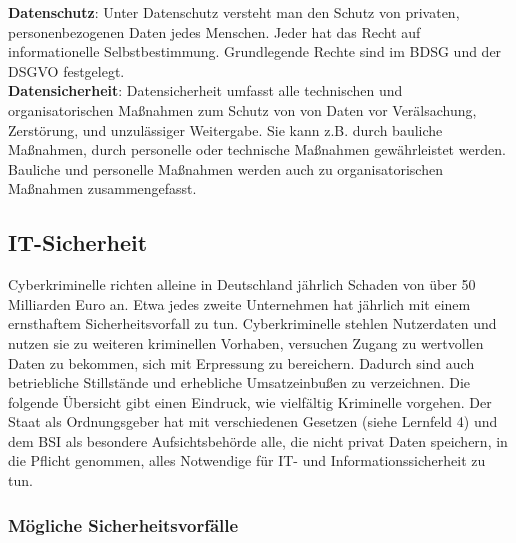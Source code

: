 \documentclass[a4paper, 12pt]{report}
\begin{document}
\begin{multicols}{2}
\textbf{Datenschutz}: Unter Datenschutz versteht man den Schutz von privaten,
personenbezogenen Daten jedes Menschen. Jeder hat das Recht auf informationelle
Selbstbestimmung. Grundlegende Rechte sind im BDSG und der DSGVO festgelegt. \\

\textbf{Datensicherheit}: Datensicherheit umfasst alle technischen und
organisatorischen Maßnahmen zum Schutz von von Daten vor Verälsachung,
Zerstörung, und unzulässiger Weitergabe. Sie kann z.B. durch bauliche Maßnahmen,
durch personelle oder technische Maßnahmen gewährleistet werden. Bauliche und
personelle Maßnahmen werden auch zu organisatorischen Maßnahmen zusammengefasst.

\subsection{IT-Sicherheit}

Cyberkriminelle richten alleine in Deutschland jährlich Schaden von über 50
Milliarden Euro an. Etwa jedes zweite Unternehmen hat jährlich mit einem
ernsthaftem Sicherheitsvorfall zu tun. Cyberkriminelle stehlen Nutzerdaten und
nutzen sie zu weiteren kriminellen Vorhaben, versuchen Zugang zu wertvollen
Daten zu bekommen, sich mit Erpressung zu bereichern. Dadurch sind auch
betriebliche Stillstände und erhebliche Umsatzeinbußen zu verzeichnen. Die
folgende Übersicht gibt einen Eindruck, wie vielfältig Kriminelle vorgehen. Der
Staat als Ordnungsgeber hat mit verschiedenen Gesetzen (siehe Lernfeld 4) und
dem BSI als besondere Aufsichtsbehörde alle, die nicht privat Daten speichern,
in die Pflicht genommen, alles Notwendige für IT- und Informationssicherheit zu
tun.

\subsubsection{Mögliche Sicherheitsvorfälle}


\end{multicols}
\end{document}
